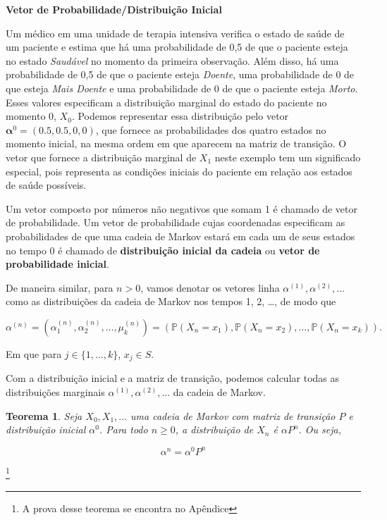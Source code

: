 \documentclass[12pt, a4paper, openany]{book}
\numberwithin{equation}{chapter}
\numberwithin{table}{chapter}
\numberwithin{figure}{chapter}
\theoremstyle{break}
\newtheorem{theorem}{Teorema}[section]
\begin{document}
\textbf{Vetor de Probabilidade/Distribuição Inicial}





Um médico em uma unidade de terapia intensiva verifica o estado de saúde de um paciente e estima que há uma probabilidade de 0,5 de que o paciente esteja no estado \textit{Saudável} no momento da primeira observação. Além disso, há uma probabilidade de 0,5 de que o paciente esteja \textit{Doente}, uma probabilidade de 0 de que esteja \textit{Mais Doente} e uma probabilidade de 0 de que o paciente esteja \textit{Morto}. Esses valores especificam a distribuição marginal do estado do paciente no momento 0, \( X_0 \). Podemos representar essa distribuição pelo vetor \( \mathbf{\alpha}^0 = (0.5, 0.5, 0, 0) \), que fornece as probabilidades dos quatro estados no momento inicial, na mesma ordem em que aparecem na matriz de transição.
O vetor que fornece a distribuição marginal de \( X_1 \) neste exemplo tem um significado especial, pois representa as condições iniciais do paciente em relação aos estados de saúde possíveis.




Um vetor composto por números não negativos que somam 1 é chamado de vetor de probabilidade. Um vetor de probabilidade cujas coordenadas especificam as probabilidades de que uma cadeia de Markov estará em cada um de seus estados no tempo 0 é chamado de \textbf{distribuição inicial da cadeia} ou \textbf{vetor de probabilidade inicial}.


De maneira similar, para $n> 0$, vamos denotar os vetores linha \( \alpha^{(1)}, \alpha^{(2)}, \ldots \) como as distribuições da cadeia de Markov nos tempos 1, 2, \ldots, de modo que

\[
\alpha^{(n)} = \left( \alpha_1^{(n)}, \alpha_2^{(n)}, \ldots, \mu_k^{(n)} \right)
= \left( \mathbb{P}(X_n = x_1), \mathbb{P}(X_n = x_2), \ldots, \mathbb{P}(X_n = x_k) \right).
\]

Em que para $j \in \{1, ..., k\}$, $x_j \in S$. 


Com a distribuição inicial e a matriz de transição,  podemos calcular todas as distribuições marginais \( \alpha^{(1)}, \alpha^{(2)}, \ldots \) da cadeia de Markov.


\begin{theorem}
Seja \( X_0, X_1, \dots \) uma cadeia de Markov com matriz de transição \( P \) e distribuição inicial \( \alpha^0 \). Para todo \( n \geq 0 \), a distribuição de \( X_n \) é \( \alpha P^n \). Ou seja,

\[
\alpha^n= \alpha^0 P^n
\]
\end{theorem}\footnote{A prova desse teorema se encontra no Apêndice}
\end{document}
